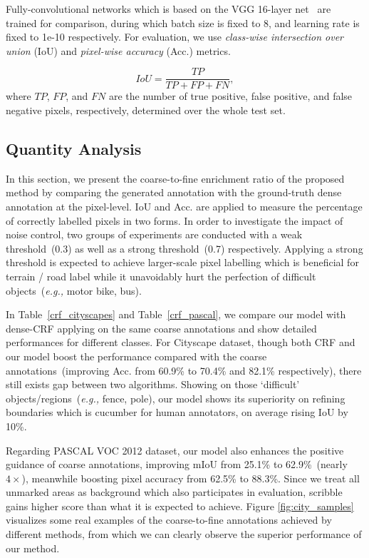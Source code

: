 \documentclass[sigconf]{acmart}
\begin{document}
Fully-convolutional networks which is based on the VGG 16-layer net~\cite{vgg} are trained for comparison, during which batch size is fixed to 8, and learning rate is fixed to 1e-10 respectively. For evaluation, we use \textit{
	class-wise intersection over union} (IoU) and \textit{pixel-wise accuracy} (Acc.) metrics.

\begin{equation}
		IoU = \frac{TP}{TP + FP +FN},
\end{equation}
where $TP$, $FP$, and $FN$ are the number of true positive, false positive, and false negative pixels, respectively, determined over the whole test set.
\subsection{Quantity Analysis}
In this section, we present the coarse-to-fine enrichment ratio of the proposed method by comparing the generated annotation with the ground-truth dense annotation at the pixel-level. IoU and Acc. are applied to measure the percentage of correctly labelled pixels in two forms. In order to investigate the impact of noise control, two groups of experiments are conducted with a weak threshold~(0.3) as well as a strong threshold~(0.7) respectively. Applying a strong threshold is expected to achieve larger-scale pixel labelling which is beneficial for terrain / road label while it unavoidably hurt the perfection of difficult objects~(\textit{e.g.,} motor bike, bus).

In Table~\ref{crf_cityscapes} and Table~\ref{crf_pascal}, we compare our model with dense-CRF applying on the same coarse annotations and show detailed performances for different classes. For Cityscape dataset, though both CRF and our model boost the performance compared with the coarse annotations~(improving Acc. from 60.9\% to 70.4\% and 82.1\% respectively), there still exists gap between two algorithms. Showing on those `difficult' objects/regions~(\textit{e.g.,} fence, pole), our model shows its superiority on refining boundaries which is cucumber for human annotators, on average rising IoU by 10\%.

Regarding PASCAL VOC 2012 dataset, our model also enhances the positive guidance of coarse annotations, improving mIoU from 25.1\% to 62.9\%~(nearly $4 \times$), meanwhile boosting pixel accuracy from 62.5\% to 88.3\%. Since we treat all unmarked areas as background which also participates in evaluation, scribble gains higher score than what it is expected to achieve. Figure \ref{fig:city_samples} visualizes some real examples of the coarse-to-fine annotations achieved by different methods, from which we can clearly observe the superior performance of our method.
\end{document}
